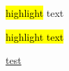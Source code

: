 \documentclass{article}
\begin{document}
 \hl{highlight} text

 \makeatletter

 \def\SOUL@ulleaders{%
     \leaders\hbox{%
      \textcolor{green}{\rule{2pt}{2.5ex}}%
      \textcolor{red}{\rule{2pt}{2.2ex}}}\relax
 }

 \def\SOUL@uleveryspace#1{%
     \SOUL@ulcolor{%
         #1%
         \leaders\hrule\@depth 0pt\@height\SOUL@ulht
         \hskip\spaceskip
     }%
     \null
 }

 \hl{highlight text}

 \ul{test}
 
\end{document}
